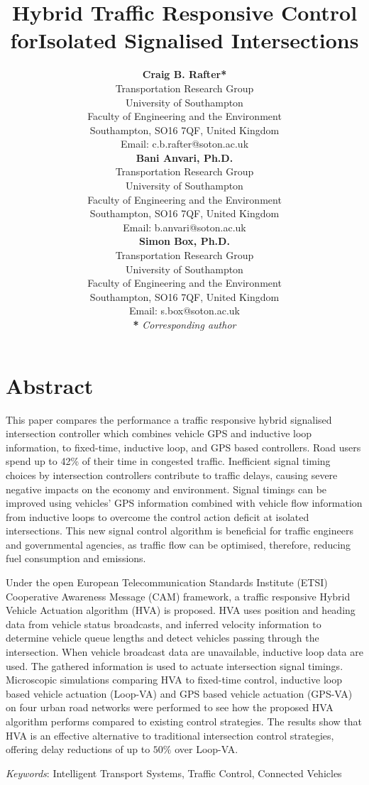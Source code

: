 \documentclass[numbered]{trbunofficial}
\title{Hybrid Traffic Responsive Control for\newline Isolated Signalised Intersections}
\author{%
  \textbf{Craig B. Rafter*}\\
	Transportation Research Group\\
	University of Southampton\\
	Faculty of Engineering and the Environment\\
	Southampton, SO16 7QF, United Kingdom\\
	Email: c.b.rafter@soton.ac.uk\\
  \hfill\break%
  \hfill\break%
  \textbf{Bani Anvari, Ph.D.}\\
	Transportation Research Group\\
	University of Southampton\\
	Faculty of Engineering and the Environment\\
	Southampton, SO16 7QF, United Kingdom\\
	Email: b.anvari@soton.ac.uk\\
	\hfill\break\hfill\break
	\textbf{Simon Box, Ph.D.}\\
	Transportation Research Group\\
	University of Southampton\\
	Faculty of Engineering and the Environment\\
	Southampton, SO16 7QF, United Kingdom\\
	Email: s.box@soton.ac.uk\\
	\hfill\break\hfill\break
	\textbf{*} \emph{Corresponding author}
}
\begin{document}
\begin{nolinenumbers}
	\maketitle
\end{nolinenumbers}


\section{Abstract}

This paper compares the performance a traffic responsive hybrid signalised intersection controller which combines vehicle GPS and inductive loop information, to fixed-time, inductive loop, and GPS based controllers. 
Road users spend up to 42\% of their time in congested traffic. 
Inefficient signal timing choices by intersection controllers contribute to traffic delays, causing severe negative impacts on the economy and environment. 
Signal timings can be improved using vehicles' GPS information combined with vehicle flow information from inductive loops to overcome the control action deficit at isolated intersections. 
This new signal control algorithm is beneficial for traffic engineers and governmental agencies, as traffic flow can be optimised, therefore, reducing fuel consumption and emissions.

Under the open European Telecommunication Standards Institute (ETSI) Cooperative Awareness Message (CAM) framework, a traffic responsive Hybrid Vehicle Actuation algorithm (HVA) is proposed. HVA uses position and heading data from vehicle status broadcasts, and inferred velocity information to determine vehicle queue lengths and detect vehicles passing through the intersection. When vehicle broadcast data are unavailable, inductive loop data are used. The gathered information is used to actuate intersection signal timings.
Microscopic simulations comparing HVA to fixed-time control, inductive loop based vehicle actuation (Loop-VA) and GPS based vehicle actuation (GPS-VA) on four urban road networks were performed to see how the proposed HVA algorithm performs compared to existing control strategies. 
The results show that HVA is an effective alternative to traditional intersection control strategies, offering delay reductions of up to ${50\%}$ over Loop-VA.

\hfill\break%
\noindent\textit{Keywords}: Intelligent Transport Systems, Traffic Control, Connected Vehicles
\newpage
\end{document}
